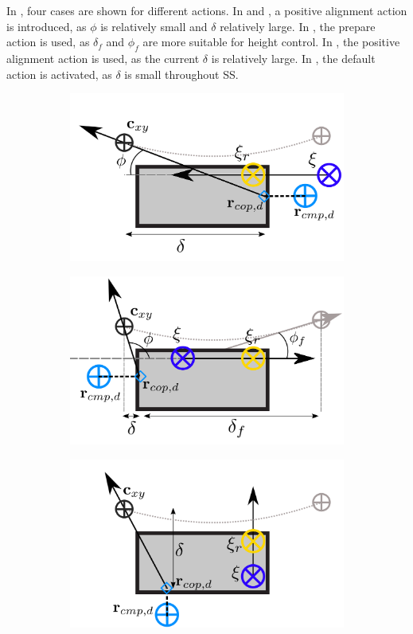 In , four cases are shown for different actions. In  and , a positive alignment action is introduced, as $\phi$ is relatively small and $\delta$ relatively large. In , the prepare action is used, as $\delta_f$ and $\phi_f$ are more suitable for height control. In , the positive alignment action is used, as the current $\delta$ is relatively large. In , the default action is activated, as $\delta$ is small throughout \ac{SS}.
\begin{figure}[h]
\centering
  \begin{subfigure}{0.49\textwidth}
  \centering
  \includegraphics[width=.7\linewidth]{STYLESTUFF/ICPplanStartSSPhiVizNegError.png}
   \caption{}
    \label{fig:phiViza}
  \end{subfigure}
  \begin{subfigure}{0.49\textwidth}
    \centering
  \includegraphics[width=.7\linewidth]{STYLESTUFF/ICPplanStartSSPhiViz.png}
  \caption{}
   \label{fig:phiVizb}
  \end{subfigure}
    \begin{subfigure}{0.49\textwidth}
    \centering
  \includegraphics[width=.7\linewidth]{STYLESTUFF/ICPplanStartSSPhiVizLeftError.png}

\end{subfigure}
\end{figure}
